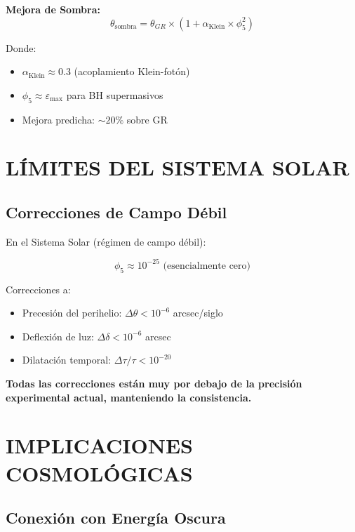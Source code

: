 \documentclass[12pt,a4paper]{article}
\begin{document}
\textbf{Mejora de Sombra:}
\begin{equation}
\theta_{\text{sombra}} = \theta_{GR} \times (1 + \alpha_{\text{Klein}} \times \phi_5^2)
\end{equation}

Donde:
\begin{itemize}
\item $\alpha_{\text{Klein}} \approx 0.3$ (acoplamiento Klein-fotón)
\item $\phi_5 \approx \varepsilon_{\max}$ para BH supermasivos
\item Mejora predicha: $\sim 20\%$ sobre GR
\end{itemize}

\section{LÍMITES DEL SISTEMA SOLAR}

\subsection{Correcciones de Campo Débil}

En el Sistema Solar (régimen de campo débil):

\begin{equation}
\phi_5 \approx 10^{-25} \text{ (esencialmente cero)}
\end{equation}

Correcciones a:
\begin{itemize}
\item Precesión del perihelio: $\Delta\theta < 10^{-6}$ arcsec/siglo
\item Deflexión de luz: $\Delta\delta < 10^{-6}$ arcsec
\item Dilatación temporal: $\Delta\tau/\tau < 10^{-20}$
\end{itemize}

\textbf{Todas las correcciones están muy por debajo de la precisión experimental actual, manteniendo la consistencia.}

\section{IMPLICACIONES COSMOLÓGICAS}

\subsection{Conexión con Energía Oscura}
\end{document}
